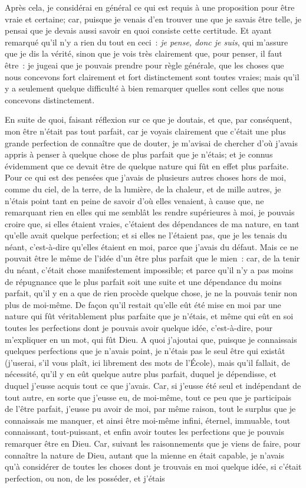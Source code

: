 \documentclass[french,twoside]{book} %
\begin{document}
Après cela, je considérai en général ce qui est requis à une proposition pour être vraie et certaine; car, puisque je venais d'en trouver une que je savais être telle, je pensai que je devais aussi savoir en quoi consiste cette certitude. Et ayant remarqué qu'il n'y a rien du tout en ceci : {\itshape je pense, donc je suis}, qui m'assure que je dis la vérité, sinon que je vois très clairement que, pour penser, il faut être : je jugeai que je pouvais prendre pour règle générale, que les choses que nous concevons fort clairement et fort distinctement sont toutes vraies; mais qu'il y a seulement quelque difficulté à bien remarquer quelles sont celles que nous concevons distinctement.\par
En suite de quoi, faisant réflexion sur ce que je doutais, et que, par conséquent, mon être n'était pas tout parfait, car je voyais clairement que c'était une plus grande perfection de connaître que de douter, je m'avisai de chercher d'où j'avais appris à penser à quelque chose de plus parfait que je n'étais; et je connus évidemment que ce devait être de quelque nature qui fût en effet plus parfaite. Pour ce qui est des pensées que j'avais de plusieurs autres choses hors de moi, comme du ciel, de la terre, de la lumière, de la chaleur, et de mille autres, je n'étais point tant en peine de savoir d'où elles venaient, à cause que, ne remarquant rien en elles qui me semblât les rendre supérieures à moi, je pouvais croire que, si elles étaient vraies, c'étaient des dépendances de ma nature, en tant qu'elle avait quelque perfection; et si elles ne l'étaient pas, que je les tenais du néant, c'est-à-dire qu'elles étaient en moi, parce que j'avais du défaut. Mais ce ne pouvait être le même de l'idée d'un être plus parfait que le mien : car, de la tenir du néant, c'était chose manifestement impossible; et parce qu'il n'y a pas moins de répugnance que le plus parfait soit une suite et une dépendance du moins parfait, qu'il y en a que de rien procède quelque chose, je ne la pouvais tenir non plus de moi-même. De façon qu'il restait qu'elle eût été mise en moi par une nature qui fût véritablement plus parfaite que je n'étais, et même qui eût en soi toutes les perfections dont je pouvais avoir quelque idée, c'est-à-dire, pour m'expliquer en un mot, qui fût Dieu. A quoi j'ajoutai que, puisque je connaissais quelques perfections que je n'avais point, je n'étais pas le seul être qui existât (j'userai, s'il vous plaît, ici librement des mots de l'École), mais qu'il fallait, de nécessité, qu'il y en eût quelque autre plus parfait, duquel je dépendisse, et duquel j'eusse acquis tout ce que j'avais. Car, si j'eusse été seul et indépendant de tout autre, en sorte que j'eusse eu, de moi-même, tout ce peu que je participais de l'être parfait, j'eusse pu avoir de moi, par même raison, tout le surplus que je connaissais me manquer, et ainsi être moi-même infini, éternel, immuable, tout connaissant, tout-puissant, et enfin avoir toutes les perfections que je pouvais remarquer être en Dieu. Car, suivant les raisonnements que je viens de faire, pour connaître la nature de Dieu, autant que la mienne en était capable, je n'avais qu'à considérer de toutes les choses dont je trouvais en moi quelque idée, si c'était perfection, ou non, de les posséder, et j'étais 
\end{document}

